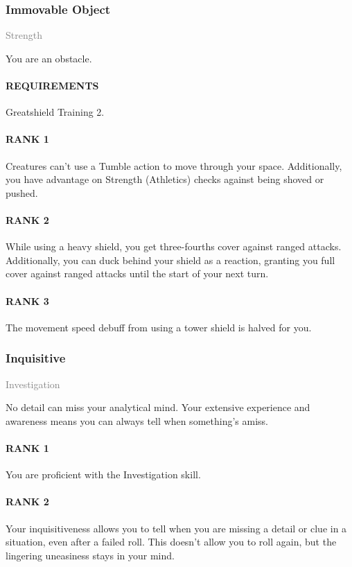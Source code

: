 \subsubsection{Immovable Object} \label{tal::immovableobject}
\small{\textcolor{gray}{Strength}}

\normalsize
You are an obstacle.
\paragraph{REQUIREMENTS} Greatshield Training 2.
\paragraph{RANK 1} Creatures can't use a Tumble action to move through your space.
Additionally, you have advantage on Strength (Athletics) checks against being shoved or pushed.
\paragraph{RANK 2} While using a heavy shield, you get three-fourths cover against ranged attacks.
Additionally, you can duck behind your shield as a reaction, granting you full cover against ranged attacks until the start of your next turn.
\paragraph{RANK 3} The movement speed debuff from using a tower shield is halved for you.

\subsubsection{Inquisitive} \label{tal::inquisitive}
\small{\textcolor{gray}{Investigation}}

\normalsize
No detail can miss your analytical mind.
Your extensive experience and awareness means you can always tell when something's amiss.
\paragraph{RANK 1} You are proficient with the Investigation skill.
\paragraph{RANK 2} Your inquisitiveness allows you to tell when you are missing a detail or clue in a situation, even after a failed roll.
This doesn't allow you to roll again, but the lingering uneasiness stays in your mind.
